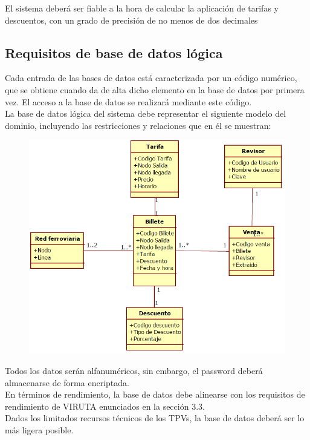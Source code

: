 El sistema deberá ser fiable a la hora de calcular la aplicación de tarifas y descuentos, con un grado de precisión de no menos de dos decimales

\subsection{Requisitos de base de datos lógica}

Cada entrada de las bases de datos está caracterizada por un código numérico, que se obtiene cuando da de alta dicho elemento en la base de datos por primera vez. El acceso a la base de datos se realizará mediante este código.\\

La base de datos lógica del sistema debe representar el siguiente modelo del dominio, incluyendo las restricciones y relaciones que en él se muestran:\\



\begin{figure}
\centering
\includegraphics[width=0.7\linewidth]{./captura}
\label{fig:captura}
\end{figure}


Todos los datos serán alfanuméricos, sin embargo, el password deberá almacenarse de forma encriptada.\\

En términos de rendimiento, la base de datos debe alinearse con los requisitos de rendimiento de VIRUTA enunciados en la sección 3.3.\\

Dados los limitados recursos técnicos de los TPVs, la base de datos deberá ser lo más ligera posible.

